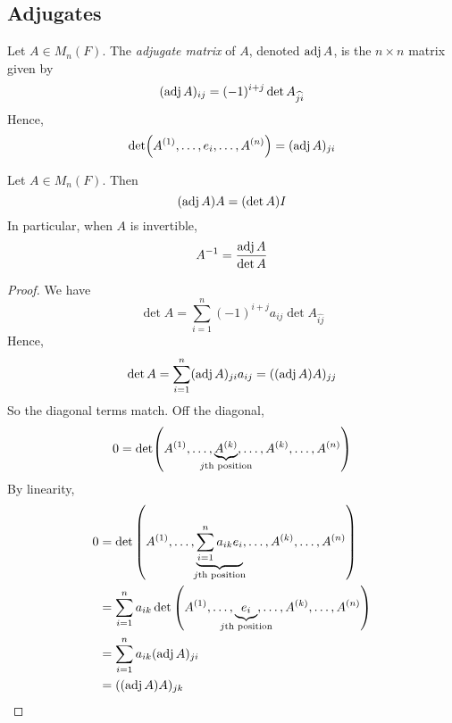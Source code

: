 \subsection{Adjugates}
\begin{definition}
	Let \( A \in M_n(F) \).
	The \textit{adjugate matrix} of \( A \), denoted \( \operatorname{adj} A \), is the \( n \times n \) matrix given by
	\[
		(\operatorname{adj} A)_{ij} = (-1)^{i+j} \det A_{\widehat{ji}}
	\]
	Hence,
	\[
		\det (A^{(1)}, \dots, e_i, \dots, A^{(n)}) = (\operatorname{adj} A)_{ji}
	\]
\end{definition}
\begin{theorem}
	Let \( A \in M_n(F) \).
	Then
	\[
		(\operatorname{adj} A) A = (\det A) I
	\]
	In particular, when \( A \) is invertible,
	\[
		A^{-1} = \frac{\operatorname{adj} A}{\det A}
	\]
\end{theorem}
\begin{proof}
	We have
	\[
		\det A = \sum_{i=1}^n (-1)^{i+j} a_{ij} \det A_{\widehat{ij}}
	\]
	Hence,
	\[
		\det A = \sum_{i=1}^n (\operatorname{adj} A)_{ji} a_{ij} = ((\operatorname{adj} A) A)_{jj}
	\]
	So the diagonal terms match.
	Off the diagonal,
	\[
		0 = \det(A^{(1)}, \dots, \underbrace{A^{(k)}}_{\mathclap{j\text{th position}}}, \dots, A^{(k)}, \dots, A^{(n)})
	\]
	By linearity,
	\begin{align*}
		0 & = \det\qty(A^{(1)}, \dots, \underbrace{\sum_{i=1}^n a_{ik} e_i}_{\mathclap{j\text{th position}}}, \dots, A^{(k)}, \dots, A^{(n)}) \\
		  & = \sum_{i=1}^n a_{ik} \det\qty(A^{(1)}, \dots, \underbrace{e_i}_{\mathclap{j\text{th position}}}, \dots, A^{(k)}, \dots, A^{(n)}) \\
		  & = \sum_{i=1}^n a_{ik} (\adj A)_{ji}                                                                                               \\
		  & = ((\adj A) A)_{jk}
	\end{align*}
\end{proof}

